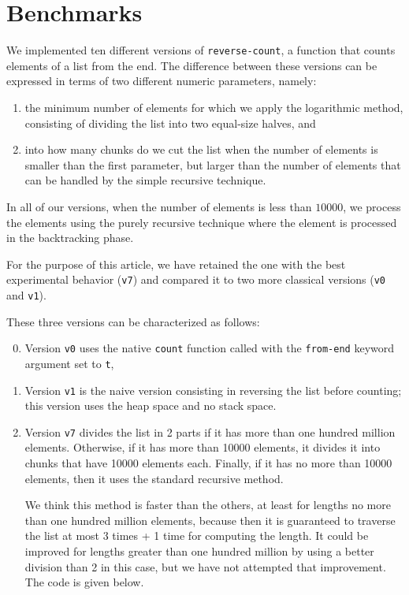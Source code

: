 \section{Benchmarks}
\label{sec-benchmarks}

We implemented ten different versions of \texttt{reverse-count}, a
function that counts elements of a list from the end.  The difference
between these versions can be expressed in terms of two different
numeric parameters, namely:

\begin{enumerate}
\item the minimum number of elements for which we apply the
  logarithmic method, consisting of dividing the list into two
  equal-size halves, and
\item into how many chunks do we cut the list when the number of
  elements is smaller than the first parameter, but larger than the
  number of elements that can be handled by the simple recursive
  technique.
\end{enumerate}

In all of our versions, when the number of elements is less than
$10000$, we process the elements using the purely recursive technique
where the element is processed in the backtracking phase.

For the purpose of this article,
we have retained the one with the best experimental behavior (\texttt{v7})
and compared it to two more classical versions  (\texttt{v0} and \texttt{v1}).

These three versions can be characterized as follows:

\begin{enumerate}
\setcounter{enumi}{-1}
\item Version \texttt{v0} uses the native \texttt{count} function
  called with the \texttt{from-end} keyword argument set to
  \texttt{t},
\item Version \texttt{v1} is the naive version consisting in reversing the list 
before counting; this version uses the heap space and no stack space.
\setcounter{enumi}{6}
\item Version \texttt{v7} divides the list in 2 parts
if it has more than one 
hundred million elements.  Otherwise, if it has more than 10000
elements, it divides it into chunks that have 10000 elements each.
Finally, if it has no more than 10000 elements, then it uses the
standard recursive method.

We think this method is faster than the others, at least for
lengths no more than one hundred million elements, because then it
is guaranteed to traverse the list at most 3 times + 1 time for
computing the length.  It could be improved for lengths greater
than one hundred million by using a better division than 2 in this
case, but we have not attempted that improvement.
The code is given below.
\end{enumerate}

